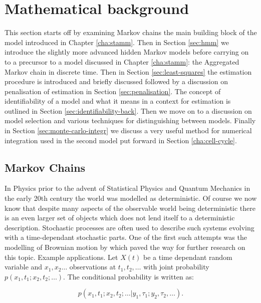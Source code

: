 \section{Mathematical background}
\label{sec:math-backgr}

This section starts off by examining Markov chains the main building block of the model introduced in Chapter \ref{cha:stamm}. Then in Section \ref{sec:hmm} we introduce the slightly more advanced hidden Markov models before carrying on to a precursor to a model discussed in Chapter \ref{cha:stamm}: the Aggregated Markov chain in discrete time. Then in Section \ref{sec:least-squares} the estimation procedure is introduced and briefly discussed followed by a discussion on penalisation of estimation in Section \ref{sec:penalisation}. The concept of identifiability of a model and what it means in a context for estimation is outlined in Section \ref{sec:identifiability-back}. Then we move on to a discussion on model selection and various techniques for distinguishing between models. Finally in Section \ref{sec:monte-carlo-integr} we discuss a very useful method for numerical integration used in the second model put forward in Section \ref{cha:cell-cycle}.

\subsection{Markov Chains}
\label{sec:markov-chains}

In Physics prior to the advent of Statistical Physics and Quantum Mechanics in the early 20th century the world was modelled as deterministic. Of course we now know that despite many aspects of the observable world being deterministic there is an even larger set of objects which does not lend itself to a deterministic description. Stochastic processes are often used to describe such systems evolving with a time-dependant stochastic parts. One of the first such attempts was the modelling of Brownian motion by \cite{Einstein:2005ww} which paved the way for further research on this topic. {\color{red} Example applications}. Let $X(t)$ be a time dependant random variable and $x_1, x_2 \ldots $ observations at $t_1, t_2, \ldots$ with joint probability $p(x_1, t_1; x_2, t_2; \ldots)$. The conditional probability is written as:

\begin{equation}
  \label{eq:stoch-joint}
  p(x_1, t_1; x_2, t_2; \ldots | y_1, \tau_1; y_2,\tau_2, \ldots).
\end{equation}

